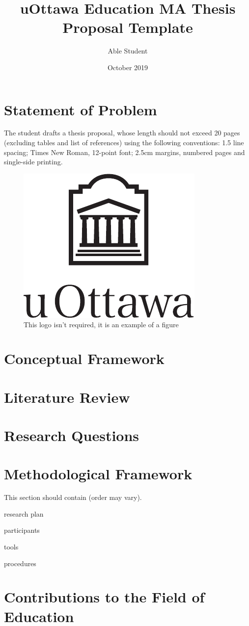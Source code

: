 \documentclass[
doc, 
biblatex,
12pt
]{apa6}
\title{uOttawa Education MA Thesis Proposal Template}
\author{Able Student}
\date{October 2019}
\affiliation{University of Ottawa}
\begin{document}
\maketitle
\nocite{*} %


\section{Statement of Problem}
The student drafts a thesis proposal, whose length should not exceed 20 pages (excluding tables and list of references) using the following conventions: 1.5 line spacing; Times New Roman, 12-point font; 2.5cm margins, numbered pages and single-side printing.

\begin{figure}[!ht]
\label{fig:logo}
\centering
\includegraphics[scale=0.8]{uottawa_ver_black.pdf}
\caption{This logo isn't required, it is an example of a figure}
\end{figure}

\section{Conceptual Framework}
\lipsum[1]

\section{Literature Review}
\lipsum[2]

\section{Research Questions}
\lipsum[3]

\section{Methodological Framework}
This section should contain (order may vary).

\begin{APAitemize}
\item research plan
\item participants
\item tools
\item procedures
\end{APAitemize}


\section{Contributions to the Field of Education}
\lipsum[4]

\printbibliography[title=References]
\end{document}
